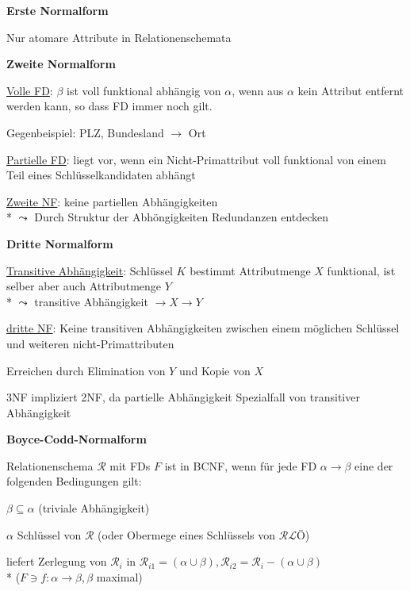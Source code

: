 \textbf{Erste Normalform}
\begin{items}
	\item Nur atomare Attribute in Relationenschemata
\end{items}

\textbf{Zweite Normalform}
\begin{items}
	\item \underline{Volle FD}: \( \beta \) ist voll funktional abhängig von \( \alpha \), wenn aus \( \alpha \) kein Attribut entfernt werden kann, so dass FD immer noch gilt.
	\item Gegenbeispiel: PLZ, Bundesland \( \to \) Ort
	\item \underline{Partielle FD}: liegt vor, wenn ein Nicht-Primattribut voll funktional von einem Teil eines Schlüsselkandidaten abhängt
	\item \underline{Zweite NF}: keine partiellen Abhängigkeiten \\* \( \leadsto \) Durch Struktur der Abhöngigkeiten Redundanzen entdecken
\end{items}

\textbf{Dritte Normalform}
\begin{items}
	\item \underline{Transitive Abhängigkeit}: Schlüssel \( K \) bestimmt Attributmenge \( X \) funktional, ist selber aber auch Attributmenge \( Y \) \\* \( \leadsto \) transitive Abhängigkeit \(  \to X \to Y \)
	\item \underline{dritte NF}: Keine transitiven Abhängigkeiten zwischen einem möglichen Schlüssel und weiteren nicht-Primattributen
	\item Erreichen durch Elimination von \( Y \) und Kopie von \( X \)
	\item 3NF impliziert 2NF, da partielle Abhängigkeit Spezialfall von transitiver Abhängigkeit
\end{items}

\textbf{Boyce-Codd-Normalform}
\begin{items}
	\item Relationenschema \( \mathcal{R} \) mit FDs \( F \) ist in BCNF, wenn für jede FD \( \alpha \to \beta \) eine der folgenden Bedingungen gilt:
	\begin{enumeration}
		\item \( \beta \subseteq \alpha \) (triviale Abhängigkeit)
		\item \( \alpha \) Schlüssel von \( \mathcal{R} \) (oder Obermege eines Schlüssels von \( \mathcal{RLÖ} \))
	\end{enumeration}
	\item liefert Zerlegung von \( \mathcal{R}_i \) in \( \mathcal{R}_{i1} = (\alpha \cup \beta), \mathcal{R}_{i2} = \mathcal{R}_i-(\alpha \cup \beta) \) \\* (\( F \ni f : \alpha \to \beta, \beta \) maximal)
\end{items}

